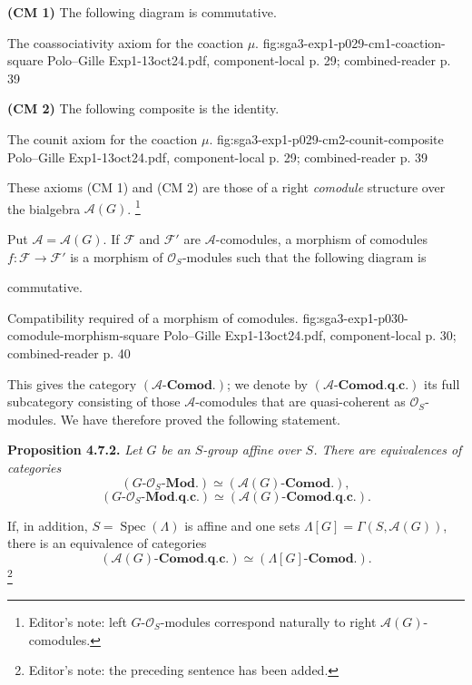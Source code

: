 \medskip
\noindent\textbf{(CM 1)} The following diagram is commutative.

  {The coassociativity axiom for the coaction \(\mu\).}
  {fig:sga3-exp1-p029-cm1-coaction-square}
  {Polo--Gille Exp1-13oct24.pdf, component-local p. 29; combined-reader p. 39}

\noindent\textbf{(CM 2)} The following composite is the identity.

  {The counit axiom for the coaction \(\mu\).}
  {fig:sga3-exp1-p029-cm2-counit-composite}
  {Polo--Gille Exp1-13oct24.pdf, component-local p. 29; combined-reader p. 39}

These axioms (CM 1) and (CM 2) are those of a right \emph{comodule}
structure over the bialgebra \(\mathscr A(G)\).
\footnote{Editor's note: left \(G\)-\(\mathcal O_S\)-modules correspond
naturally to right \(\mathscr A(G)\)-comodules.}

Put \(\mathscr A=\mathscr A(G)\). If \(\mathscr F\) and
\(\mathscr F'\) are \(\mathscr A\)-comodules, a morphism of comodules
\(f:\mathscr F\to\mathscr F'\) is a morphism of
\(\mathcal O_S\)-modules such that the following diagram is

commutative.

  {Compatibility required of a morphism of comodules.}
  {fig:sga3-exp1-p030-comodule-morphism-square}
  {Polo--Gille Exp1-13oct24.pdf, component-local p. 30; combined-reader p. 40}

This gives the category \((\mathscr A\text{-}\mathbf{Comod.})\); we
denote by \((\mathscr A\text{-}\mathbf{Comod.q.c.})\) its full
subcategory consisting of those \(\mathscr A\)-comodules that are
quasi-coherent as \(\mathcal O_S\)-modules. We have therefore proved the
following statement.

\medskip
\noindent\textbf{Proposition 4.7.2.}
\textit{Let \(G\) be an \(S\)-group affine over \(S\). There are
equivalences of categories
\[
  (G\text{-}\mathcal O_S\text{-}\mathbf{Mod.})
    \simeq(\mathscr A(G)\text{-}\mathbf{Comod.}),
\]
\[
  (G\text{-}\mathcal O_S\text{-}\mathbf{Mod.q.c.})
    \simeq(\mathscr A(G)\text{-}\mathbf{Comod.q.c.}).
\]}

If, in addition, \(S=\operatorname{Spec}(\Lambda)\) is affine and one
sets \(\Lambda[G]=\Gamma(S,\mathscr A(G))\), there is an equivalence of
categories
\[
  (\mathscr A(G)\text{-}\mathbf{Comod.q.c.})
    \simeq(\Lambda[G]\text{-}\mathbf{Comod.}).
\]
\footnote{Editor's note: the preceding sentence has been added.}


